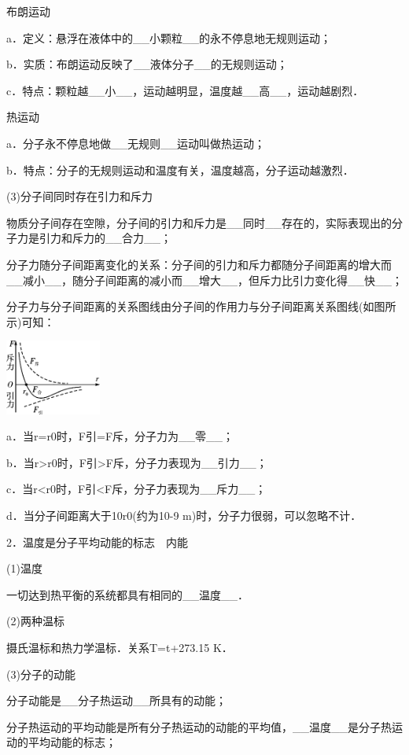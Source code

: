 布朗运动

a．定义：悬浮在液体中的\_\_小颗粒\_\_的永不停息地无规则运动；

b．实质：布朗运动反映了\_\_液体分子\_\_的无规则运动；

c．特点：颗粒越\_\_小\_\_，运动越明显，温度越\_\_高\_\_，运动越剧烈．

热运动

a．分子永不停息地做\_\_无规则\_\_运动叫做热运动；

b．特点：分子的无规则运动和温度有关，温度越高，分子运动越激烈．

(3)分子间同时存在引力和斥力

物质分子间存在空隙，分子间的引力和斥力是\_\_同时\_\_存在的，实际表现出的分子力是引力和斥力的\_\_合力\_\_；

分子力随分子间距离变化的关系：分子间的引力和斥力都随分子间距离的增大而\_\_减小\_\_，随分子间距离的减小而\_\_增大\_\_，但斥力比引力变化得\_\_快\_\_；

分子力与分子间距离的关系图线由分子间的作用力与分子间距离关系图线(如图所示)可知：

\begin{center}\includegraphics[width=1.23611in,height=0.97153in]{media/image485.png}\end{center}
a．当r=r0时，F引=F斥，分子力为\_\_零\_\_；

b．当r\textgreater r0时，F引\textgreater F斥，分子力表现为\_\_引力\_\_；

c．当r\textless r0时，F引\textless F斥，分子力表现为\_\_斥力\_\_；

d．当分子间距离大于10r0(约为10-9 m)时，分子力很弱，可以忽略不计．

2．温度是分子平均动能的标志　内能

(1)温度

一切达到热平衡的系统都具有相同的\_\_温度\_\_．

(2)两种温标

摄氏温标和热力学温标．关系T=t+273.15 K．

(3)分子的动能

分子动能是\_\_分子热运动\_\_所具有的动能；

分子热运动的平均动能是所有分子热运动的动能的平均值，\_\_温度\_\_是分子热运动的平均动能的标志；

